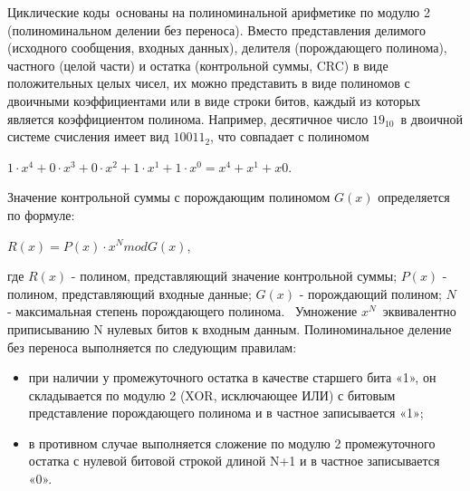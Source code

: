 Циклические коды основаны на полиноминальной арифметике по модулю 2 (полиноминальном делении без переноса).
Вместо представления делимого (исходного сообщения, входных данных), делителя (порождающего полинома), частного
(целой части) и остатка (контрольной суммы, CRC) в виде положительных целых чисел, их можно представить в виде полиномов
 с двоичными коэффициентами или в виде строки битов, каждый из которых является коэффициентом полинома.
Например, десятичное число $19_{10}$ в двоичной системе счисления имеет вид $10011_2$, что совпадает с полиномом

$ 1 \cdot x^4 + 0 \cdot x^3 + 0 \cdot x^2 + 1\cdot x^1 + 1 \cdot x^0 = x^4 + x^1 + x0$.

Значение контрольной суммы с порождающим полиномом $G(x)$ определяется по формуле:

$R(x) = P(x) \cdot  x^N mod G(x)$, 

где $R(x)$ \-- полином, представляющий значение контрольной суммы;
$P(x)$ \-- полином, представляющий входные данные;
$G(x)$ \-- порождающий полином;
$N$ \-- максимальная степень порождающего полинома.
 Умножение $x^N$ эквивалентно приписыванию N нулевых битов к входным данным.
Полиноминальное деление без переноса выполняется по следующим правилам:
\begin{itemize}
\item при наличии у промежуточного остатка в качестве старшего бита «1», он складывается по модулю 2 (XOR, исключающее ИЛИ) с битовым представление порождающего полинома и в частное записывается «1»;
\item в противном случае выполняется сложение по модулю 2 промежуточного остатка с нулевой битовой строкой длиной N+1 и в частное записывается «0».
\end{itemize}